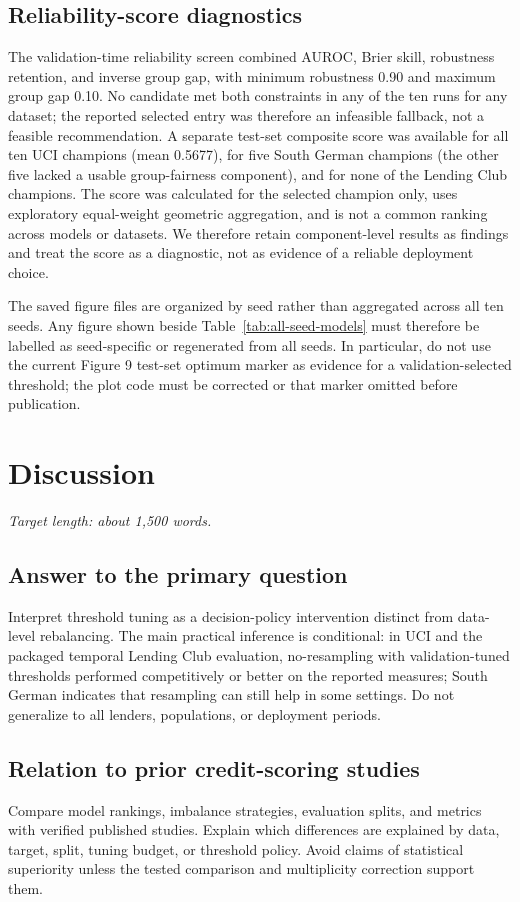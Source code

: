 \documentclass[pdflatex,sn-mathphys-num]{sn-jnl}
\begin{document}
\subsection{Reliability-score diagnostics}
The validation-time reliability screen combined AUROC, Brier skill, robustness retention, and inverse group gap, with minimum robustness 0.90 and maximum group gap 0.10. No candidate met both constraints in any of the ten runs for any dataset; the reported selected entry was therefore an infeasible fallback, not a feasible recommendation. A separate test-set composite score was available for all ten UCI champions (mean 0.5677), for five South German champions (the other five lacked a usable group-fairness component), and for none of the Lending Club champions. The score was calculated for the selected champion only, uses exploratory equal-weight geometric aggregation, and is not a common ranking across models or datasets. We therefore retain component-level results as findings and treat the score as a diagnostic, not as evidence of a reliable deployment choice.

The saved figure files are organized by seed rather than aggregated across all ten seeds. Any figure shown beside Table~\ref{tab:all-seed-models} must therefore be labelled as seed-specific or regenerated from all seeds. In particular, do not use the current Figure 9 test-set optimum marker as evidence for a validation-selected threshold; the plot code must be corrected or that marker omitted before publication.

\section{Discussion}
\textit{Target length: about 1,500 words.}

\subsection{Answer to the primary question}
Interpret threshold tuning as a decision-policy intervention distinct from data-level rebalancing. The main practical inference is conditional: in UCI and the packaged temporal Lending Club evaluation, no-resampling with validation-tuned thresholds performed competitively or better on the reported measures; South German indicates that resampling can still help in some settings. Do not generalize to all lenders, populations, or deployment periods.

\subsection{Relation to prior credit-scoring studies}
Compare model rankings, imbalance strategies, evaluation splits, and metrics with verified published studies. Explain which differences are explained by data, target, split, tuning budget, or threshold policy. Avoid claims of statistical superiority unless the tested comparison and multiplicity correction support them.
\end{document}
